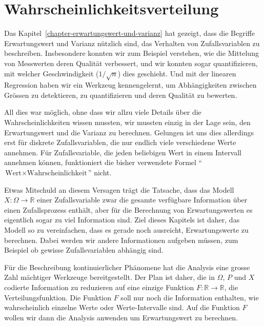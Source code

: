 %
%
%
\chapter{Wahrscheinlichkeitsverteilung} \label{chapter-wahrscheinlichkeitsverteilung}

Das Kapitel~\ref{chapter-erwartungswert-und-varianz} hat gezeigt, dass die
Begriffe Erwartungswert und Varianz nützlich sind, das Verhalten von
Zufallsvariablen zu beschreiben.
Insbesondere konnten wir zum Beispiel verstehen, wie die Mittelung von
Messwerten deren Qualität verbessert, und wir konnten sogar quantifizieren,
mit welcher Geschwindigkeit ($1/\sqrt{n}$) dies geschieht.
Und mit der linearen Regression haben wir ein Werkzeug kennengelernt, 
um Abhängigkeiten zwischen Grössen zu detektieren, zu quantifizieren
und deren Qualität zu bewerten.

All dies war möglich, ohne dass wir allzu viele Details über die
Wahrscheinlichkeiten wissen mussten, wir mussten einzig in der Lage sein,
den Erwartungswert und die Varianz zu berechnen.
Gelungen ist uns dies allerdings erst für diskrete Zufallsvariablen,
die nur endlich viele verschiedene Werte annehmen.
Für Zufallsvariable, die jeden beliebigen Wert in einem Intervall annehmen
können, funktioniert die bisher verwendete Formel
``$\text{Wert}\times\text{Wahrscheinlichkeit}$''
nicht.

Etwas Mitschuld an diesem Versagen trägt die Tatsache, dass das Modell
$X\colon\Omega\to\mathbb R$ einer Zufallsvariable zwar die gesamte verfügbare
Information über einen Zufallsprozess enthält, aber für die Berechnung 
von Erwartungswerten es eigentlich sogar zu viel Information sind.
Ziel dieses Kapitels ist daher, das Modell so zu vereinfachen, dass
es gerade noch ausreicht, Erwartungswerte zu berechnen.
Dabei werden wir andere Informationen aufgeben müssen,
zum Beispiel ob gewisse Zufallsvariablen abhängig sind.

Für die Beschreibung kontinuierlicher Phänomene hat die Analysis
eine grosse Zahl mächtiger Werkzeuge bereitgestellt.
Der Plan ist daher, die in $\Omega$, $P$ und $X$ codierte
Information zu reduzieren auf eine einzige Funktion $F\colon\mathbb R\to\mathbb R$,
die Verteilungsfunktion.
Die Funktion $F$ soll nur noch die Information enthalten, wie wahrscheinlich
einzelne Werte oder Werte-Intervalle sind.
Auf die Funktion $F$ wollen wir dann die Analysis anwenden um 
Erwartungswert zu berechnen.

